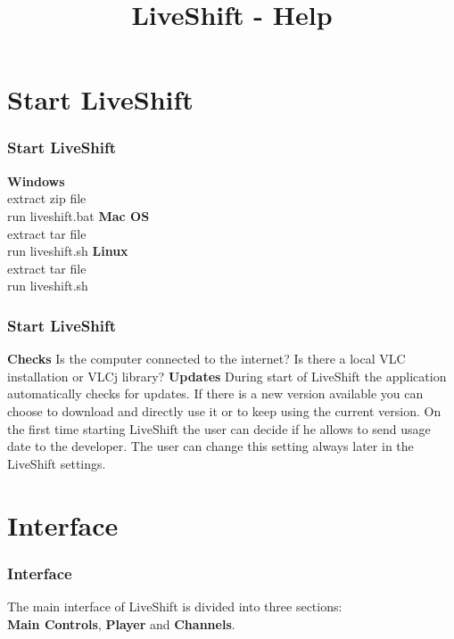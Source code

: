 \documentclass{beamer}
\title{LiveShift - Help}
\begin{document}

\frame{
\titlepage
}


\section[Outline]{}

\section{Start LiveShift}
\frame
{
\frametitle{Start LiveShift}
\textbf{Windows}\\
extract zip file\\
run liveshift.bat
\linebreak 
\linebreak 
\textbf{Mac OS}\\
extract tar file\\
run liveshift.sh
\linebreak 
\linebreak 
\textbf{Linux}\\
extract tar file\\
run liveshift.sh\\
}

\frame
{
\frametitle{Start LiveShift}
\textbf{Checks}\linebreak
Is the computer connected to the internet?\linebreak
Is there a local VLC installation or VLCj library?\linebreak
\linebreak
\textbf{Updates}\linebreak
During start of LiveShift the application automatically checks for updates.
\linebreak
If there is a new version available you can choose to download and directly use it or to keep using the current version.
\linebreak
On the first time starting LiveShift the user can decide if he allows to send usage date to the developer. The user can change this setting always later in the LiveShift settings.
}

\section{Interface}
\frame
{
\frametitle{Interface}
The main interface of LiveShift is divided into three sections:\\
\textbf{Main Controls}, \textbf{Player} and \textbf{Channels}.
}
\end{document}
